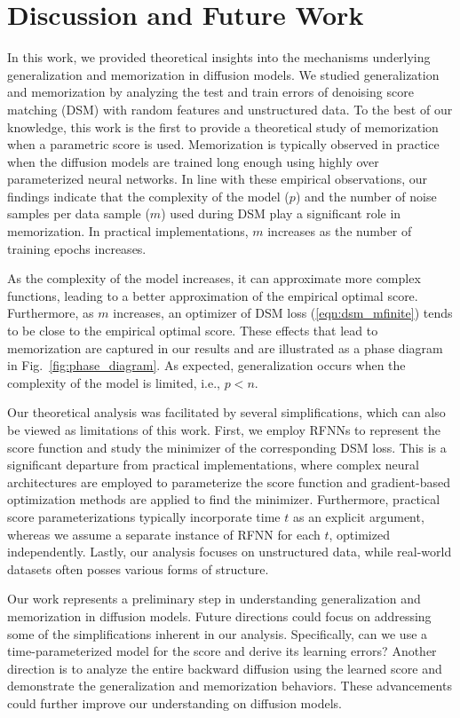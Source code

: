 \section{Discussion and Future Work}
In this work, we provided theoretical insights into the mechanisms underlying generalization and memorization in diffusion models.
We studied generalization and memorization by analyzing the test and train errors of denoising score matching (DSM) with random features and unstructured data. To the best of our knowledge, this work is the first to provide a theoretical study of memorization when a parametric score is used. Memorization is typically observed in practice when the diffusion models are trained long enough using highly over parameterized neural networks. In line with these empirical observations, our findings indicate that the complexity of the model ($p$) and the number of noise samples per data sample ($m$) used during DSM play a significant role in memorization. In practical implementations, $m$ increases as the number of training epochs increases.

As the complexity of the model increases, it can approximate more complex functions, leading to a better approximation of the empirical optimal score. Furthermore, as $m$ increases, an optimizer of DSM loss (\ref{eqn:dsm_mfinite}) tends to be close to the empirical optimal score.  These effects that lead to memorization are captured in our results and are illustrated as a phase diagram in Fig.~\ref{fig:phase_diagram}. As expected, generalization occurs when the complexity of the model is limited, i.e., $p<n$.

 Our theoretical analysis was facilitated by several simplifications, which can also be viewed as limitations of this work. First, we employ RFNNs to represent the score function and study the minimizer of the corresponding DSM loss. This is a significant departure from practical implementations, where complex neural architectures are employed to parameterize the score function and gradient-based optimization methods are applied to find the minimizer. Furthermore, practical score parameterizations typically incorporate time $t$ as an explicit argument, whereas we assume a separate instance of RFNN for each $t$, optimized independently. Lastly, our analysis focuses on unstructured data, while real-world datasets often posses various forms of structure. 

Our work represents a preliminary step in understanding generalization and memorization in diffusion models. Future directions could focus on addressing some of the simplifications inherent in our analysis. Specifically, can we use a time-parameterized model for the score and derive its learning errors? Another direction is to analyze the entire backward diffusion using the learned score and demonstrate the generalization and memorization behaviors. These advancements could further improve our understanding on diffusion models.

